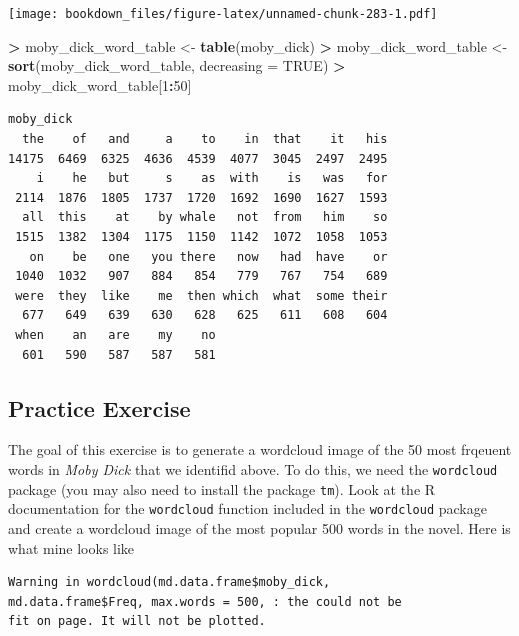 \documentclass[]{krantz}
\makeatletter
\newenvironment{Shaded}{\begin{snugshade}}{\end{snugshade}}
\newcommand{\KeywordTok}[1]{\textcolor[rgb]{0.27,0.27,0.27}{\textbf{#1}}}
\newcommand{\DataTypeTok}[1]{\textcolor[rgb]{0.27,0.27,0.27}{#1}}
\newcommand{\DecValTok}[1]{\textcolor[rgb]{0.06,0.06,0.06}{#1}}
\newcommand{\StringTok}[1]{\textcolor[rgb]{0.5,0.5,0.5}{#1}}
\newcommand{\OtherTok}[1]{\textcolor[rgb]{0.37,0.37,0.37}{#1}}
\newcommand{\OperatorTok}[1]{\textcolor[rgb]{0.43,0.43,0.43}{\textbf{#1}}}
\newcommand{\NormalTok}[1]{#1}
\newenvironment{kframe}{%
\medskip{}
\setlength{\fboxsep}{.8em}
 \def\at@end@of@kframe{}%
 \ifinner\ifhmode%
  \def\at@end@of@kframe{\end{minipage}}%
  \begin{minipage}{\columnwidth}%
 \fi\fi%
 \def\FrameCommand##1{\hskip\@totalleftmargin \hskip-\fboxsep
 \colorbox{shadecolor}{##1}\hskip-\fboxsep
     \hskip-\linewidth \hskip-\@totalleftmargin \hskip\columnwidth}%
 \MakeFramed {\advance\hsize-\width
   \@totalleftmargin\z@ \linewidth\hsize
   \@setminipage}}%
 {\par\unskip\endMakeFramed%
 \at@end@of@kframe}
\renewenvironment{Shaded}{\begin{kframe}}{\end{kframe}}
\makeatother
\begin{document}
\texttt{[image: bookdown\_files/figure-latex/unnamed-chunk-283-1.pdf]}

\begin{Shaded}
\begin{Highlighting}[]
\OperatorTok{>}\StringTok{ }\NormalTok{moby_dick_word_table <-}\StringTok{ }\KeywordTok{table}\NormalTok{(moby_dick)}
\OperatorTok{>}\StringTok{ }\NormalTok{moby_dick_word_table <-}\StringTok{ }\KeywordTok{sort}\NormalTok{(moby_dick_word_table, }\DataTypeTok{decreasing =} \OtherTok{TRUE}\NormalTok{)}
\OperatorTok{>}\StringTok{ }\NormalTok{moby_dick_word_table[}\DecValTok{1}\OperatorTok{:}\DecValTok{50}\NormalTok{]}
\end{Highlighting}
\end{Shaded}

\begin{verbatim}
moby_dick
  the    of   and     a    to    in  that    it   his 
14175  6469  6325  4636  4539  4077  3045  2497  2495 
    i    he   but     s    as  with    is   was   for 
 2114  1876  1805  1737  1720  1692  1690  1627  1593 
  all  this    at    by whale   not  from   him    so 
 1515  1382  1304  1175  1150  1142  1072  1058  1053 
   on    be   one   you there   now   had  have    or 
 1040  1032   907   884   854   779   767   754   689 
 were  they  like    me  then which  what  some their 
  677   649   639   630   628   625   611   608   604 
 when    an   are    my    no 
  601   590   587   587   581 
\end{verbatim}

\subsection{Practice Exercise}\label{practice-exercise-15}

The goal of this exercise is to generate a wordcloud image of the 50
most frqeuent words in \emph{Moby Dick} that we identifid above. To do
this, we need the \texttt{wordcloud} package (you may also need to
install the package \texttt{tm}). Look at the R documentation for the
\texttt{wordcloud} function included in the \texttt{wordcloud} package
and create a wordcloud image of the most popular 500 words in the novel.
Here is what mine looks like

\begin{verbatim}
Warning in wordcloud(md.data.frame$moby_dick,
md.data.frame$Freq, max.words = 500, : the could not be
fit on page. It will not be plotted.
\end{verbatim}
\end{document}
